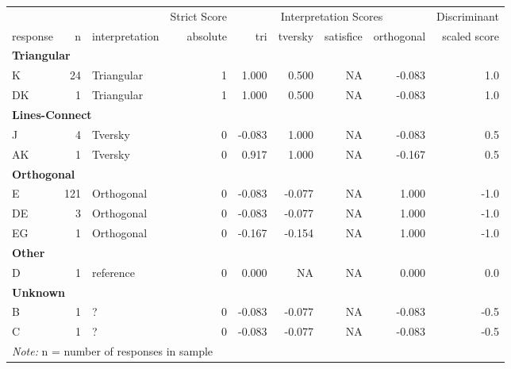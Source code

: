 \documentclass[
  letterpaper,
  DIV=11,
  numbers=noendperiod]{scrreprt}
\begin{document}
\begin{tabular}[t]{l|r|l|r|r|r|r|r|r}
\hline
\multicolumn{3}{c|}{ } & \multicolumn{1}{c|}{Strict Score} & \multicolumn{4}{c|}{Interpretation Scores} & \multicolumn{1}{c}{Discriminant} \\
\cline{4-4} \cline{5-8} \cline{9-9}
response & n & interpretation & absolute & tri & tversky & satisfice & orthogonal & scaled score\\
\hline
\multicolumn{9}{l}{\textbf{Triangular}}\\
\hline
\hspace{1em}K & 24 & Triangular & 1 & 1.000 & 0.500 & NA & -0.083 & 1.0\\
\hline
\hspace{1em}DK & 1 & Triangular & 1 & 1.000 & 0.500 & NA & -0.083 & 1.0\\
\hline
\multicolumn{9}{l}{\textbf{Lines-Connect}}\\
\hline
\hspace{1em}J & 4 & Tversky & 0 & -0.083 & 1.000 & NA & -0.083 & 0.5\\
\hline
\hspace{1em}AK & 1 & Tversky & 0 & 0.917 & 1.000 & NA & -0.167 & 0.5\\
\hline
\multicolumn{9}{l}{\textbf{Orthogonal}}\\
\hline
\hspace{1em}E & 121 & Orthogonal & 0 & -0.083 & -0.077 & NA & 1.000 & -1.0\\
\hline
\hspace{1em}DE & 3 & Orthogonal & 0 & -0.083 & -0.077 & NA & 1.000 & -1.0\\
\hline
\hspace{1em}EG & 1 & Orthogonal & 0 & -0.167 & -0.154 & NA & 1.000 & -1.0\\
\hline
\multicolumn{9}{l}{\textbf{Other}}\\
\hline
\hspace{1em}D & 1 & reference & 0 & 0.000 & NA & NA & 0.000 & 0.0\\
\hline
\multicolumn{9}{l}{\textbf{Unknown}}\\
\hline
\hspace{1em}B & 1 & ? & 0 & -0.083 & -0.077 & NA & -0.083 & -0.5\\
\hline
\hspace{1em}C & 1 & ? & 0 & -0.083 & -0.077 & NA & -0.083 & -0.5\\
\hline
\multicolumn{9}{l}{\rule{0pt}{1em}\textit{Note: } n = number of responses in sample}\\
\end{tabular}
\end{document}
